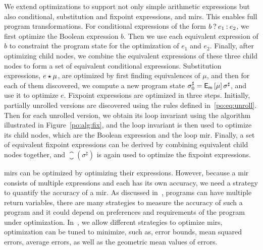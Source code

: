 We extend optimizations to support not only simple arithmetic expressions but
also conditional, substitution and fixpoint expressions, and \glspl{mir}.  This
enables full program transformations.  For conditional expressions of the form
$b\mathbin{?} e_1\mathbin{:} e_2$, we first optimize the Boolean expression $b$.  Then
we use each equivalent expression of $b$ to constraint the program state for
the optimization of $e_1$ and $e_2$.  Finally, after optimizing child nodes,
we combine the equivalent expressions of these three child nodes to form a
set of equivalent conditional expressions.  Substitution expressions, $e
\mathbin{\star} \mu$, are optimized by first finding equivalences of $\mu$, and then
for each of them discovered, we compute a new program state $\sigma^\sharp_0
= \operatorname{\mathsf{E}_\mathsf{m}}\left[{\mu}\right] \sigma^\sharp$, and use it to optimize $e$.  Fixpoint
expressions are optimized in three steps.  Initially, partially unrolled
versions are discovered using the rules defined in~\eqref{po:eq:unroll}.  Then
for each unrolled version, we obtain its loop invariant using the algorithm
illustrated in Figure~\ref{po:alg:fix}, and the loop invariant is then used
to optimize its child nodes, which are the Boolean expression and the loop
\gls{mir}\@.  Finally, a set of equivalent fixpoint expressions can be derived
by combining equivalent child nodes together, and $\closure(\sigma^\sharp)$ is
again used to optimize the fixpoint expressions.

\glspl{mir} can be optimized by optimizing their expressions.  However, because
a \gls{mir} consists of multiple expressions and each has its own accuracy,
we need a strategy to quantify the accuracy of a \gls{mir}\@.  As discussed
in~\cite{martel09}, programs can have multiple return variables, there are many
strategies to measure the accuracy of such a program and it could depend on
preferences and requirements of the program under optimization.  In~\newsoap,
we allow different strategies to optimize \glspl{mir}, optimization can be
tuned to minimize, such as, error bounds, mean squared errors, average errors,
as well as the geometric mean values of errors.
